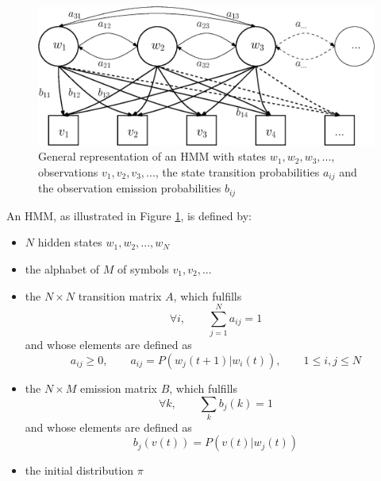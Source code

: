 \documentclass[a4paper, oneside]{csthesis}
\begin{document}
\begin{figure}[tb]
    \begin{center}
        \includegraphics[width=\textwidth]{figures/hmm-general-model.eps}
    \end{center}
    \caption{General representation of an HMM with states $w_1, w_2, w_3, ...$, observations $v_1, v_2, v_3, ...$, the state transition probabilities $a_{ij}$ and the observation emission probabilities $b_{ij}$}
    \label{fig:hmm-general-model}
\end{figure}


An HMM, as illustrated in Figure \ref{fig:hmm-general-model}, is defined by:

\begin{itemize}
 \item $N$ hidden states $w_1, w_2, ..., w_N$
 \item the alphabet of $M$ of symbols $v_1, v_2, ...$
 \item the $N\times N$ transition matrix $A$, which fulfills
 $$\forall i,\qquad \sum_{j=1}^{N} a_{ij} = 1$$
 and whose elements are defined as
 $$a_{ij} \geq 0, \qquad a_{ij} = P(w_j(t+1)|w_i(t)), \qquad 1 \leq i,j \leq N$$

 \item the $N \times M$ emission matrix $B$, which fulfills
 $$\forall k,\qquad \sum_k b_j(k) = 1 $$
 and whose elements are defined as
 $$b_j(v(t)) = P(v(t)|w_j(t))$$

 \item the initial distribution $\pi$
\end{itemize}
\end{document}
